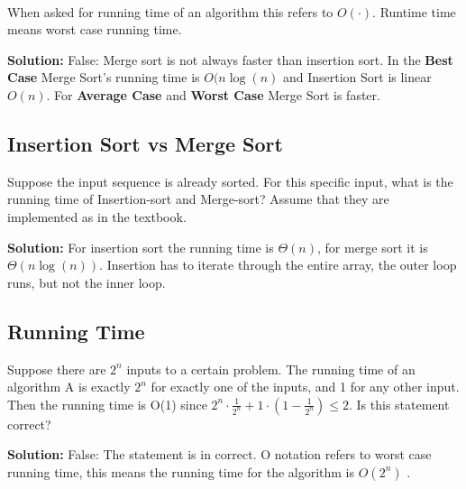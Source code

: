 \documentclass[11pt,fleqn]{book}
\begin{document}
\\
\begin{remark}
When asked for running time of an algorithm this refers to $O(\cdot)$. Runtime time means worst case running time. 
\end{remark}
\vspace{1em}
\textbf{Solution: } 
False: Merge sort is not always faster than insertion sort. In the \textbf{Best Case} Merge Sort's running time is $O(n\log(n)$ and Insertion Sort is linear $O(n)$. For \textbf{Average Case} and \textbf{Worst Case} Merge Sort is faster. 
\subsection{Insertion Sort vs Merge Sort}
\begin{example}
Suppose the input sequence is already sorted.  For this specific input, what is the running time of Insertion-sort and Merge-sort?  Assume that they are implemented as in the textbook.
\end{example}
\textbf{Solution:} For insertion sort the running time is $\Theta(n)$, for merge sort it is $\Theta(n\log(n))$. Insertion has to iterate through the entire array, the outer loop runs, but not the inner loop. 
\subsection{Running Time}
\begin{example}
Suppose there are $2^n$ inputs to a certain problem. The running time of an algorithm A is exactly $2^n$ for exactly one of the inputs, and 1 for any other input. Then the running time is O(1) since $2^n \cdot \frac{1}{2^n} + 1\cdot(1 - \frac{1}{2^n}) \leq 2$. Is this statement correct?
\end{example}
\textbf{Solution:} 
False: The statement is in correct. O notation refers to worst case running time, this means the running time for the algorithm is $O(2^n)$ .
\end{document}
